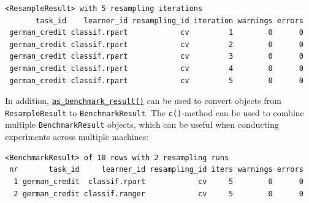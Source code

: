 \begin{Shaded}
\begin{Highlighting}[]
\OtherTok{=}\SpecialCharTok{$}\NormalTok{(}\NormalTok{)}
\end{Highlighting}
\end{Shaded}

\begin{verbatim}
<ResampleResult> with 5 resampling iterations
       task_id    learner_id resampling_id iteration warnings errors
 german_credit classif.rpart            cv         1        0      0
 german_credit classif.rpart            cv         2        0      0
 german_credit classif.rpart            cv         3        0      0
 german_credit classif.rpart            cv         4        0      0
 german_credit classif.rpart            cv         5        0      0
\end{verbatim}

\begin{Shaded}
\begin{Highlighting}[]
\OtherTok{=}\SpecialCharTok{$}\NormalTok{(}\NormalTok{)}
\end{Highlighting}
\end{Shaded}

In addition,
\href{https://mlr3.mlr-org.com/reference/as_benchmark_result.html}{\texttt{as\_benchmark\_result()}}
can be used to convert objects from \texttt{ResampleResult} to
\texttt{BenchmarkResult}. The \texttt{c()}-method can be used to combine
multiple \texttt{BenchmarkResult} objects, which can be useful when
conducting experiments across multiple machines:

\begin{Shaded}
\begin{Highlighting}[]
\OtherTok{=} 
\OtherTok{=} 

\end{Highlighting}
\end{Shaded}

\begin{verbatim}
<BenchmarkResult> of 10 rows with 2 resampling runs
 nr       task_id     learner_id resampling_id iters warnings errors
  1 german_credit  classif.rpart            cv     5        0      0
  2 german_credit classif.ranger            cv     5        0      0
\end{verbatim}

